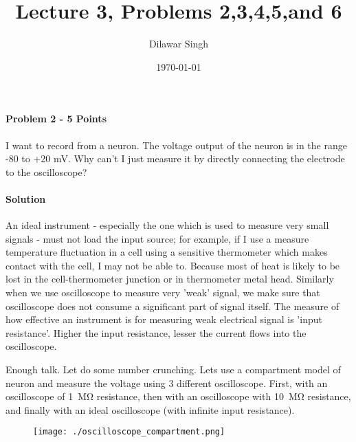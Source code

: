 \documentclass[a4paper,10pt]{article}
\title{Lecture 3, Problems 2,3,4,5,and 6}
\author{Dilawar Singh}
\date{\today}
\begin{document}
\maketitle

\paragraph{Problem 2 - 5 Points}
I want to record from a neuron. The voltage output of the neuron is in the range
-80 to +20 mV. Why can’t I just measure it by directly connecting the electrode
to the oscilloscope?

\paragraph{Solution} An ideal instrument - especially the one which is used to
measure very small signals - must not load the input source; for example, if I
use a measure temperature fluctuation in a cell using a sensitive thermometer
which makes contact with the cell, I may not be able to. Because most of heat is
likely to be lost in the cell-thermometer junction or in thermometer metal head.
Similarly when we use oscilloscope to measure very 'weak' signal, we make sure
that oscilloscope does not consume a significant part of signal itself. The
measure of how effective an instrument is for measuring weak electrical signal
is 'input resistance'. Higher the input resistance, lesser the current flows
into the oscilloscope. 

Enough talk. Let do some number crunching. Lets use a compartment model of
neuron and measure the voltage using 3 different oscilloscope. First, with an
oscilloscope of \SI{1}{\mega \ohm} resistance, then with an oscilloscope with
\SI{10}{\mega \ohm} resistance, and finally with an ideal oscilloscope (with infinite input
resistance). 

\begin{figure}[h!]
    \texttt{[image: ./oscilloscope\_compartment.png]}
\end{figure}
\end{document}
